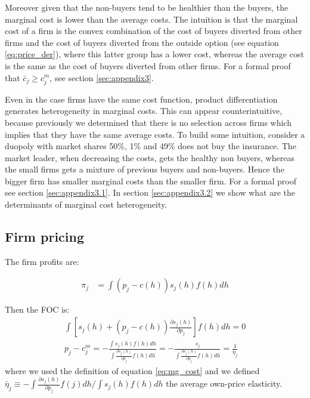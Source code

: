 \documentclass[12pt]{article}
\theoremstyle{plain}
\theoremstyle{plain}
\begin{document}
Moreover given that the non-buyers tend to be healthier than the buyers, the marginal cost is lower than the average costs. The intuition is that the marginal cost of a firm is the convex combination of the cost of buyers diverted from other firms and the cost of  buyers diverted from the outside option (see equation \ref{eq:price_der}), where this latter group has a lower cost, whereas the average cost is the same as the cost of buyers diverted from other firms.  For a formal proof that $ \bar{c}_j \geq c_j^m$, see section \ref{sec:appendix3}. 


Even in the case firms have the same cost function, product differentiation generates  heterogeneity in marginal costs. This can appear counterintuitive, because previously we determined that there is no selection across firms which implies that they have the same average costs. To build some intuition, consider a duopoly with market shares 50\%, 1\% and 49\% does not buy the insurance. The market leader, when decreasing the costs, gets the healthy non buyers, whereas the small firms gets a mixture of previous buyers and non-buyers. Hence the bigger firm has smaller marginal costs than the smaller firm. 
For a formal proof see section \ref{sec:appendix3.1}.
In section \ref{sec:appendix3.2} we show what are the determinants of marginal cost heterogeneity. 

\subsection{Firm pricing}\label{sec:pricing}
The firm profits are:

\begin{align}
    \pi_j &= \int ( p_j -c(h) )s_j(h) f(h) dh  
\end{align}

Then the FOC is: 
\begin{align}\label{eq:FOC}
    \int \left[s_j(h)+ ( p_j -c(h) )\frac{\partial s_j(h)}{\partial p_j}\right] f(h) dh =0  \\
    p_j- c^m_j  = - \frac{\int s_j(h) f(h) dh}{\int  \frac{\partial s_j(h)}{\partial p_j} f(h) dh} = - \frac{ s_j}{\int  \frac{\partial s_j(h)}{\partial p_j} f(h) dh} = \frac{1}{\bar{\eta}_j}
\end{align}
where we used the definition of equation \ref{eq:mg_cost} and we defined $\bar{\eta}_j \equiv -\int \frac{\partial s_j(h)}{\partial p_j}f(j)dh / \int s_j(h) f(h)dh$  the average own-price elasticity. 
\end{document}
